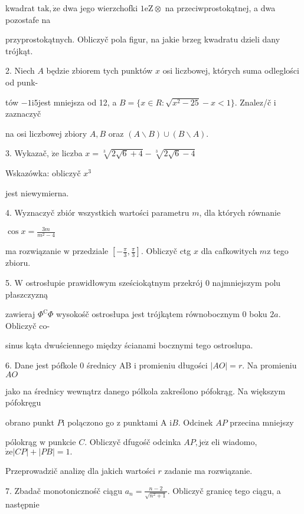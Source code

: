 \documentclass[a4paper,12pt]{article}
\begin{document}
kwadrat $\mathrm{t}\mathrm{a}\mathrm{k}, \dot{\mathrm{z}}\mathrm{e}$ dwa jego wierzchofki $ 1\mathrm{e}\mathrm{Z}\otimes$ na przeciwprostokątnej, a dwa pozostafe na

przyprostokątnych. Obliczyč pola figur, na jakie brzeg kwadratu dzieli dany trójkąt.

2. Niech $A$ będzie zbiorem tych punktów $x$ osi liczbowej, których suma odleglości od punk-

tów $-1\mathrm{i}5$jest mniejsza od 12, a $B=\{x\in R:\sqrt{x^{2}-25}-x<1\}$. Znalez/č $\mathrm{i}$ zaznaczyč

na osi liczbowej zbiory $A, B$ oraz $(A\backslash B)\cup(B\backslash A).$

3. Wykazač, $\dot{\mathrm{z}}\mathrm{e}$ liczba $x=\sqrt[3]{2\sqrt{6}+4}-\sqrt[3]{2\sqrt{6}-4}$

Wskazówka: obliczyč $x^{3}$

jest niewymierna.

4. Wyznaczyč zbiór wszystkich wartości parametru $m$, dla których równanie

$\displaystyle \cos x=\frac{3m}{m^{2}-4}$

ma rozwiązanie $\mathrm{w}$ przedziale $[-\displaystyle \frac{\pi}{3},\frac{\pi}{3}]$. Obliczyč ctg $x$ dla cafkowitych $m\mathrm{z}$ tego zbioru.

5. $\mathrm{W}$ ostrosłupie prawidłowym sześciokątnym przekrój $0$ najmniejszym polu płaszczyzną

zawieraj $\Phi^{\mathrm{C}}\Phi$ wysokośč ostrosłupa jest trójkątem równobocznym $0$ boku $2a$. Obliczyč co-

sinus kąta dwuściennego między ścianami bocznymi tego ostroslupa.

6. Dane jest pófkole $0$ średnicy AB $\mathrm{i}$ promieniu długości $|AO| = r$. Na promieniu $AO$

jako na średnicy wewnątrz danego pólkola zakreślono pófokrąg. Na większym pófokręgu

obrano punkt $P \mathrm{i}$ polączono go $\mathrm{z}$ punktami A $\mathrm{i} B$. Odcinek $AP$ przecina mniejszy

pólokrąg $\mathrm{w}$ punkcie $C$. Obliczyč dfugośč odcinka $AP, \mathrm{j}\mathrm{e}\dot{\mathrm{z}}$ eli wiadomo, $\dot{\mathrm{z}}\mathrm{e}|CP|+|PB|=1.$

Przeprowadzič analizę dla jakich wartości $r$ zadanie ma rozwiązanie.

7. Zbadač monotonicznośč ciągu $a_{n} = \displaystyle \frac{n-2}{\sqrt{n^{2}+1}}$. Obliczyč granicę tego ciągu, a następnie
\end{document}
